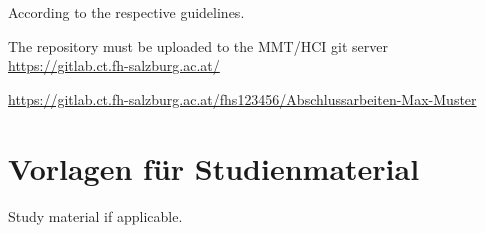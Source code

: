 \begin{appendices}
According to the respective guidelines.

The repository must be uploaded to the MMT/HCI git server {\url{https://gitlab.ct.fh-salzburg.ac.at/}}

{\color{red}\url{https://gitlab.ct.fh-salzburg.ac.at/fhs123456/Abschlussarbeiten-Max-Muster}}
	
\section{Vorlagen für Studienmaterial}

Study material if applicable. 

\end{appendices}
